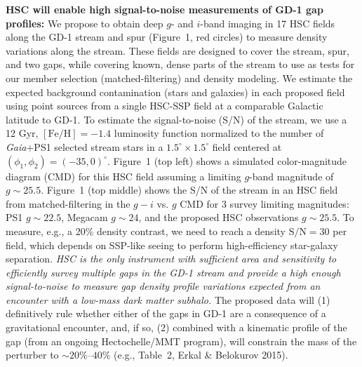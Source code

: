 \documentclass[11pt]{article}
\begin{document}
\textbf{HSC will enable high signal-to-noise measurements of GD-1 gap profiles:}
We propose to obtain deep $g$- and $i$-band imaging in 17 HSC fields along the GD-1 stream and spur (Figure~1, red circles) to measure density variations along the stream.
These fields are designed to cover the stream, spur, and two gaps, while covering known, dense parts of the stream to use as tests for our member selection (matched-filtering) and density modeling.
We estimate the expected background contamination (stars and galaxies) in each proposed field using point sources from a single HSC-SSP field at a comparable Galactic latitude to GD-1. %
To estimate the signal-to-noise (S/N) of the stream, we use a 12 Gyr, $[\textrm{Fe}/\textrm{H}] = -1.4$ luminosity function normalized to the number of \textit{Gaia}+PS1 selected stream stars in a $1.5^\circ \times 1.5^\circ$ field centered at $(\phi_1, \phi_2) = (-35, 0)^\circ$.
Figure~1 (top left) shows a simulated color-magnitude diagram (CMD) for this HSC field assuming a limiting $g$-band magnitude of $g \sim 25.5$.
Figure~1 (top middle) shows the S/N of the stream in an HSC field from matched-filtering in the $g-i$ vs. $g$ CMD for 3 survey limiting magnitudes: PS1 $g \sim 22.5$, Megacam $g \sim 24$, and the proposed HSC observations $g \sim 25.5$.
To measure, e.g., a 20\% density contrast, we need to reach a density $\textrm{S}/\textrm{N} = 30$ per field, which depends on SSP-like seeing to perform high-efficiency star-galaxy separation.
\emph{HSC is the only instrument with sufficient area and sensitivity to efficiently survey multiple gaps in the GD-1 stream and provide a high enough signal-to-noise to measure gap density profile variations expected from an encounter with a low-mass dark matter subhalo.}
The proposed data will (1) definitively rule whether either of the gaps in GD-1 are a consequence of a gravitational encounter, and, if so, (2) combined with a kinematic profile of the gap (from an ongoing Hectochelle/MMT program), will constrain the mass of the perturber to $\sim 20\%$--$40\%$ (e.g., Table~2, Erkal \& Belokurov 2015).
\end{document}
